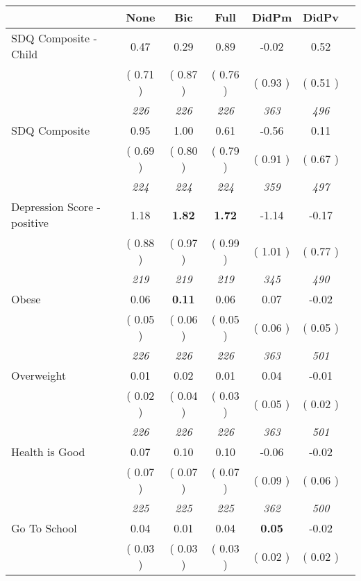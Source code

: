 \begin{tabular}{l c c c c c c}
\toprule
 & None & Bic & Full & DidPm & DidPv \\
\midrule
SDQ Composite - Child &      0.47 &      0.29 &      0.89 &     -0.02 &      0.52 \\
& (     0.71 ) & (     0.87 ) & (     0.76 ) & (     0.93 ) & (     0.51 ) \\
& \textit{ 226 } & \textit{ 226 } & \textit{ 226 } & \textit{ 363 } & \textit{ 496 } \\
SDQ Composite &      0.95 &      1.00 &      0.61 &     -0.56 &      0.11 \\
& (     0.69 ) & (     0.80 ) & (     0.79 ) & (     0.91 ) & (     0.67 ) \\
& \textit{ 224 } & \textit{ 224 } & \textit{ 224 } & \textit{ 359 } & \textit{ 497 } \\
Depression Score - positive &      1.18 & \textbf{      1.82 } & \textbf{      1.72 } &     -1.14 &     -0.17 \\
& (     0.88 ) & (     0.97 ) & (     0.99 ) & (     1.01 ) & (     0.77 ) \\
& \textit{ 219 } & \textit{ 219 } & \textit{ 219 } & \textit{ 345 } & \textit{ 490 } \\
Obese &      0.06 & \textbf{      0.11 } &      0.06 &      0.07 &     -0.02 \\
& (     0.05 ) & (     0.06 ) & (     0.05 ) & (     0.06 ) & (     0.05 ) \\
& \textit{ 226 } & \textit{ 226 } & \textit{ 226 } & \textit{ 363 } & \textit{ 501 } \\
Overweight &      0.01 &      0.02 &      0.01 &      0.04 &     -0.01 \\
& (     0.02 ) & (     0.04 ) & (     0.03 ) & (     0.05 ) & (     0.02 ) \\
& \textit{ 226 } & \textit{ 226 } & \textit{ 226 } & \textit{ 363 } & \textit{ 501 } \\
Health is Good &      0.07 &      0.10 &      0.10 &     -0.06 &     -0.02 \\
& (     0.07 ) & (     0.07 ) & (     0.07 ) & (     0.09 ) & (     0.06 ) \\
& \textit{ 225 } & \textit{ 225 } & \textit{ 225 } & \textit{ 362 } & \textit{ 500 } \\
Go To School &      0.04 &      0.01 &      0.04 & \textbf{      0.05 } &     -0.02 \\
& (     0.03 ) & (     0.03 ) & (     0.03 ) & (     0.02 ) & (     0.02 ) \\

\end{tabular}
